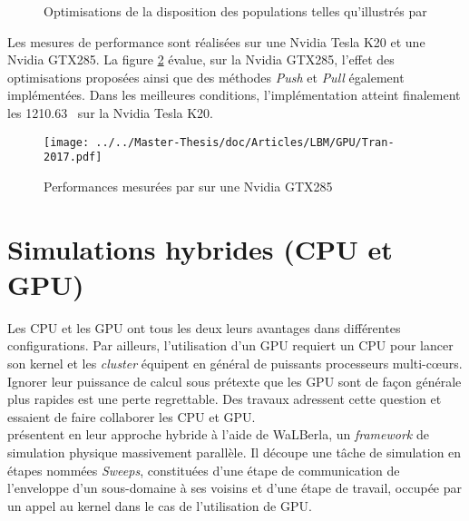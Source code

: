 \begin{figure}[h]
	\centering
	\caption{Optimisations de la disposition des populations telles qu'illustrés par \cite{tran_performance_2017}}
	\label{fig:tran_opt}
\end{figure} 

Les mesures de performance sont réalisées sur une Nvidia Tesla K20 et une Nvidia GTX285. La figure \ref{fig:tran_perf} évalue, sur la Nvidia GTX285, l'effet des optimisations proposées ainsi que des méthodes \textit{Push} et \textit{Pull} également implémentées. Dans les meilleures conditions, l’implémentation atteint finalement les 1210.63~ sur la Nvidia Tesla K20.

\begin{figure}[H]
	\centering
	\texttt{[image: ../../Master-Thesis/doc/Articles/LBM/GPU/Tran-2017.pdf]}
	\caption{Performances mesurées par \cite{tran_performance_2017} sur une Nvidia GTX285}
	\label{fig:tran_perf}
\end{figure} 


\section{Simulations hybrides (\acs{CPU} et \acs{GPU})}
Les \acs{CPU} et les \acs{GPU} ont tous les deux leurs avantages dans différentes configurations. Par ailleurs, l'utilisation d'un \acs{GPU} requiert un \acs{CPU} pour lancer son kernel et les \textit{cluster} équipent en général de puissants processeurs multi-cœurs. Ignorer leur puissance de calcul sous prétexte que les \acs{GPU} sont de façon générale plus rapides est une perte regrettable. Des travaux adressent cette question et essaient de faire collaborer les \acs{CPU} et \acs{GPU}.\\

\citet{feichtinger_flexible_2011} présentent en \citeyear{feichtinger_flexible_2011} leur approche hybride à l'aide de WaLBerla, un \textit{framework} de simulation physique massivement parallèle. Il découpe une tâche de simulation en étapes nommées \textit{Sweeps}, constituées d'une étape de communication de l'enveloppe d'un sous-domaine à ses voisins et d'une étape de travail, occupée par un appel au kernel dans le cas de l'utilisation de \acs{GPU}. 

